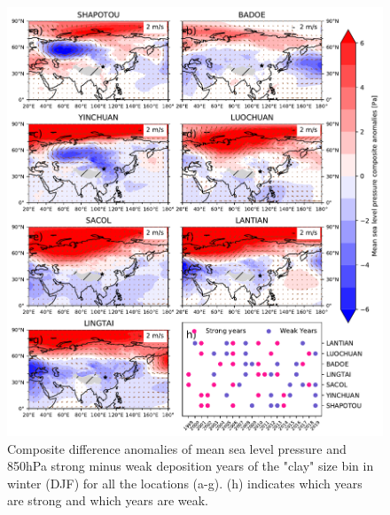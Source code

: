 \begin{figure}[hp]
    \centering
    \includegraphics[width=\columnwidth]{texfiles/figs/mslp_850hPa_2micron_DJF.pdf}
    \caption{Composite difference anomalies of mean sea level pressure and 850hPa strong minus weak deposition years of the "clay" size bin in winter (DJF) for all the locations (a-g). (h) indicates which years are strong and which years are weak.}
    \label{fig:DJF_850_fine_composite}
\end{figure}

